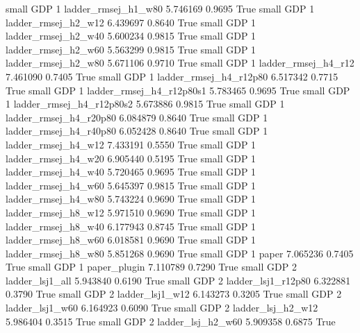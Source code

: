      small      GDP                 1      ladder_rmsej_h1_w80   5.746169      0.9695    True
     small      GDP                 1      ladder_rmsej_h2_w12   6.439697      0.8640    True
     small      GDP                 1      ladder_rmsej_h2_w40   5.600234      0.9815    True
     small      GDP                 1      ladder_rmsej_h2_w60   5.563299      0.9815    True
     small      GDP                 1      ladder_rmsej_h2_w80   5.671106      0.9710    True
     small      GDP                 1      ladder_rmsej_h4_r12   7.461090      0.7405    True
     small      GDP                 1   ladder_rmsej_h4_r12p80   6.517342      0.7715    True
     small      GDP                 1 ladder_rmsej_h4_r12p80s1   5.783465      0.9695    True
     small      GDP                 1 ladder_rmsej_h4_r12p80s2   5.673886      0.9815    True
     small      GDP                 1   ladder_rmsej_h4_r20p80   6.084879      0.8640    True
     small      GDP                 1   ladder_rmsej_h4_r40p80   6.052428      0.8640    True
     small      GDP                 1      ladder_rmsej_h4_w12   7.433191      0.5550    True
     small      GDP                 1      ladder_rmsej_h4_w20   6.905440      0.5195    True
     small      GDP                 1      ladder_rmsej_h4_w40   5.720465      0.9695    True
     small      GDP                 1      ladder_rmsej_h4_w60   5.645397      0.9815    True
     small      GDP                 1      ladder_rmsej_h4_w80   5.743224      0.9690    True
     small      GDP                 1      ladder_rmsej_h8_w12   5.971510      0.9690    True
     small      GDP                 1      ladder_rmsej_h8_w40   6.177943      0.8745    True
     small      GDP                 1      ladder_rmsej_h8_w60   6.018581      0.9690    True
     small      GDP                 1      ladder_rmsej_h8_w80   5.851268      0.9690    True
     small      GDP                 1                    paper   7.065236      0.7405    True
     small      GDP                 1             paper_plugin   7.110789      0.7290    True
     small      GDP                 2          ladder_lsj1_all   5.943840      0.6190    True
     small      GDP                 2       ladder_lsj1_r12p80   6.322881      0.3790    True
     small      GDP                 2          ladder_lsj1_w12   6.143273      0.3205    True
     small      GDP                 2          ladder_lsj1_w60   6.164923      0.6090    True
     small      GDP                 2        ladder_lsj_h2_w12   5.986404      0.3515    True
     small      GDP                 2        ladder_lsj_h2_w60   5.909358      0.6875    True
